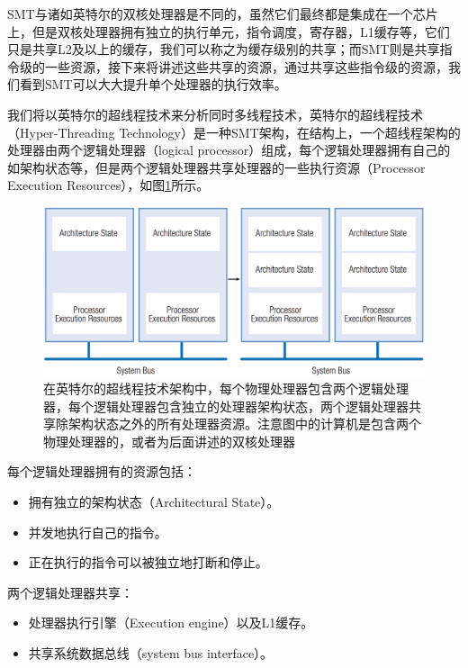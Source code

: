 SMT与诸如英特尔的双核处理器是不同的，虽然它们最终都是集成在一个芯片上，但是双核处理器拥有独立的执行单元，指令调度，寄存器，L1缓存等，它们只是共享L2及以上的缓存，我们可以称之为缓存级别的共享；而SMT则是共享指令级的一些资源，接下来将讲述这些共享的资源，通过共享这些指令级的资源，我们看到SMT可以大大提升单个处理器的执行效率。

我们将以英特尔的超线程技术来分析同时多线程技术，英特尔的超线程技术（Hyper-Threading Technology）是一种SMT架构，在结构上，一个超线程架构的处理器由两个逻辑处理器（logical processor）组成，每个逻辑处理器拥有自己的如架构状态等，但是两个逻辑处理器共享处理器的一些执行资源（Processor Execution Resources），如图\ref{f:rp-hyper-threading}所示。

\begin{figure}
	\includegraphics[width=1.\textwidth]{figures/rp/hyper-threading}
	\caption{在英特尔的超线程技术架构中，每个物理处理器包含两个逻辑处理器，每个逻辑处理器包含独立的处理器架构状态，两个逻辑处理器共享除架构状态之外的所有处理器资源。注意图中的计算机是包含两个物理处理器的，或者为后面讲述的双核处理器}
	\label{f:rp-hyper-threading}
\end{figure}

每个逻辑处理器拥有的资源包括：

\begin{itemize}
	\item 拥有独立的架构状态（Architectural State）。
	\item 并发地执行自己的指令。
	\item 正在执行的指令可以被独立地打断和停止。
\end{itemize}

两个逻辑处理器共享：
\begin{itemize}
	\item 处理器执行引擎（Execution engine）以及L1缓存。
	\item 共享系统数据总线（system bus interface）。
\end{itemize}


